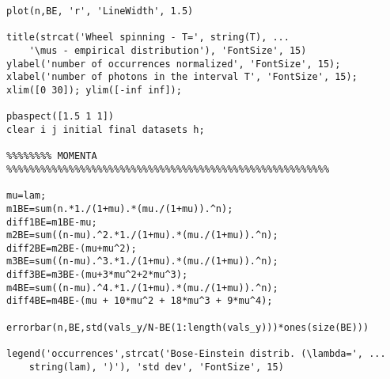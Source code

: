 \begin{lstlisting}[basicstyle=\scriptsize,]
plot(n,BE, 'r', 'LineWidth', 1.5)

title(strcat('Wheel spinning - T=', string(T), ...
    '\mus - empirical distribution'), 'FontSize', 15)
ylabel('number of occurrences normalized', 'FontSize', 15);
xlabel('number of photons in the interval T', 'FontSize', 15); 
xlim([0 30]); ylim([-inf inf]);

pbaspect([1.5 1 1])
clear i j initial final datasets h;

%%%%%%%% MOMENTA %%%%%%%%%%%%%%%%%%%%%%%%%%%%%%%%%%%%%%%%%%%%%%%%%%%%%%%%%

mu=lam;
m1BE=sum(n.*1./(1+mu).*(mu./(1+mu)).^n);
diff1BE=m1BE-mu;
m2BE=sum((n-mu).^2.*1./(1+mu).*(mu./(1+mu)).^n);
diff2BE=m2BE-(mu+mu^2);
m3BE=sum((n-mu).^3.*1./(1+mu).*(mu./(1+mu)).^n);
diff3BE=m3BE-(mu+3*mu^2+2*mu^3);
m4BE=sum((n-mu).^4.*1./(1+mu).*(mu./(1+mu)).^n);
diff4BE=m4BE-(mu + 10*mu^2 + 18*mu^3 + 9*mu^4);

errorbar(n,BE,std(vals_y/N-BE(1:length(vals_y)))*ones(size(BE)))

legend('occurrences',strcat('Bose-Einstein distrib. (\lambda=', ...
    string(lam), ')'), 'std dev', 'FontSize', 15)
\end{lstlisting}